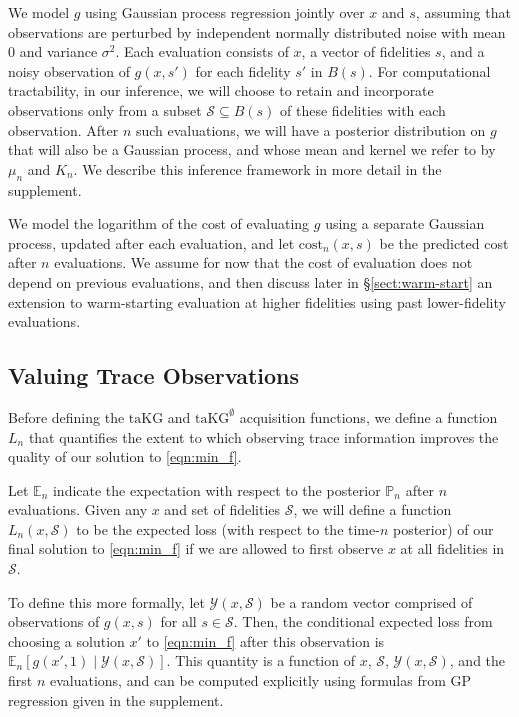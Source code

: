 \documentclass[letterpaper]{article}
\newcommand{\E}{\mathbb{E}}
\newcommand{\cost}{\text{cost}}
\newcommand{\taKG}{\text{taKG}}
\newcommand{\taKGE}{\text{taKG}^\emptyset}
\numberwithin{equation}{section}
\let\Section\S
\renewcommand{\S}{\mathcal{S}}
\newcommand{\sectn}[1]{\Section\ref{#1}}
\newcommand{\Y}{\mathcal{Y}}
\newcommand{\loss}{L}
\begin{document}
We model $g$ using Gaussian process regression jointly over $x$ and $s$, assuming that observations are perturbed by independent normally distributed noise with mean $0$ and variance $\sigma^2$.  Each evaluation consists of $x$, a vector of fidelities $s$, and a noisy observation of $g(x,s')$ for each fidelity $s'$ in $B(s)$.  For computational tractability, in our inference, we will choose to retain and incorporate observations only from a subset $\mathcal{S} \subseteq B(s)$ of these fidelities with each observation.  After $n$ such evaluations, we will have a posterior distribution on $g$ that will also be a Gaussian process, and whose mean and kernel we refer to by $\mu_n$ and $K_n$.  We describe this inference framework in more detail in the supplement.

We model the logarithm of the cost of evaluating $g$ using a separate Gaussian process, updated after each evaluation,
and let $\cost_n(x,s)$ be the predicted cost after $n$ evaluations.
We assume for now that the cost of evaluation does not depend on previous evaluations, and then discuss later in \sectn{sect:warm-start} an extension to warm-starting evaluation at higher fidelities using past lower-fidelity evaluations.



\subsection{Valuing Trace Observations}
\label{sect:valuing}

Before defining the $\taKG$ and $\taKGE$ acquisition functions, we define a function $\loss_n$ that quantifies the extent to which observing trace information improves the quality of our solution to \eqref{eqn:min_f}.

Let $\E_n$ indicate the expectation with respect to the posterior $\mathbb{P}_n$ after $n$ evaluations.  Given any $x$ and set of fidelities $\S$, 
we will define a function $\loss_n(x,\S)$ to be the expected loss (with respect to the time-$n$ posterior) of our final solution to \eqref{eqn:min_f} if we are allowed to first observe $x$ at all fidelities in $\S$.

To define this more formally, let $\Y(x,\S)$ be a random vector comprised of observations of $g(x,s)$ for all $s \in \S$.  Then, the conditional expected loss from choosing a solution $x'$ to \eqref{eqn:min_f} after this observation is $\E_n\left[g(x',1) \mid \Y(x,\S)\right]$.  
This quantity is a function of $x$, $\S$, $\Y(x,\S)$, and the first $n$ evaluations, and 
can be computed explicitly using formulas from GP regression given in the supplement.
\end{document}

